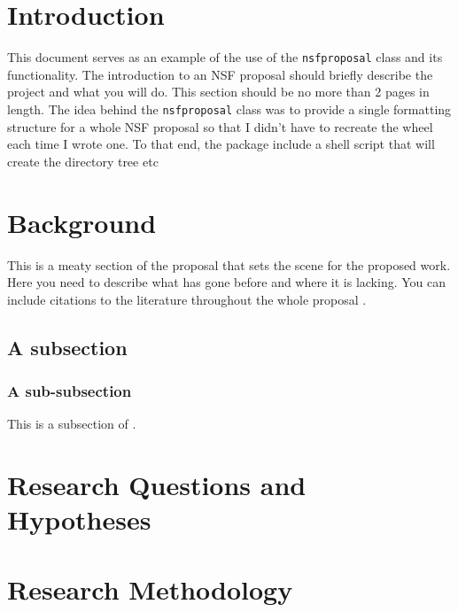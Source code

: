 \documentclass[nsfdescription]{nsfproposal}
\begin{document}
\section{Introduction}
\label{sec:intro}
This document serves as an example of the use of the \texttt{nsfproposal} class and its functionality. The introduction to an NSF proposal
should briefly describe the project and what you will do. This section should be no more than 2 pages in length. The idea behind the 
\texttt{nsfproposal} class was to provide a single formatting structure for a whole NSF 
proposal so that I didn't have to recreate the wheel
each time I wrote one. To that end, the package include a shell script that will create the directory tree etc 

\lipsum[1-5]

\section{Background}
\label{sec:background}
This is a meaty section of the proposal that sets the scene for the proposed work. Here you need to describe what has gone before
and where it is lacking.  You can include citations to the literature throughout the whole proposal  \citep{fasham-etal-1990}.

\lipsum[1-2]

\subsection{A subsection}
\label{sec:subsection1}

\lipsum[1-4]

\subsubsection{A sub-subsection}
\label{sec:subsubsection1}
This is a subsection of . 

\lipsum[1-2]

\section{Research Questions and Hypotheses}
\label{sec:hypotheses}

\lipsum[1-3]

\section{Research Methodology}
\label{sec:methodology}
\end{document}
